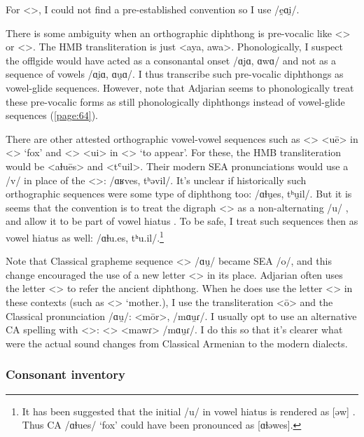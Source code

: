For <>, I could not find a pre-established convention so I use /e̯ɑi̯/. 
	
There is some ambiguity when an orthographic diphthong is pre-vocalic like <> or <>. The HMB transliteration is just <aya, awa>. Phonologically, I suspect the offlgide would have acted as a consonantal onset /ɑjɑ, ɑwɑ/ and not as a sequence of vowels /ɑi̯ɑ, ɑu̯ɑ/. I thus transcribe such pre-vocalic diphthongs as vowel-glide sequences. However, note that Adjarian seems to phonologically treat these pre-vocalic forms as still phonologically diphthongs instead of vowel-glide sequences (\ref{page:64}). 




There are other attested orthographic vowel-vowel sequences such as <> <uē> in <> `fox' and <> <ui> in <> `to appear'. For these, the HMB transliteration would be <aɫuēs> and <tʿuil>. Their modern SEA pronunciations would use a /v/ in place of the <>: /ɑʁves, tʰəvil/. It's unclear if historically such orthographic sequences were some type of diphthong too: /ɑɫu̯es, tʰu̯il/. But it is seems that the convention is to treat the digraph <> as a non-alternating /u/ \citep[15]{Thomson-1989-IntroClassicalArmenian}, and allow it to be part of vowel hiatus \citep[17]{Thomson-1989-IntroClassicalArmenian}. To be safe, I treat such sequences then as vowel hiatus as well: /ɑɫu.es, tʰu.il/.\footnote{It has been suggested that the initial /u/ in vowel hiatus is rendered as [əw] \citep[13]{Kim-2021-phoneticsPhonologyOldArmenianWV}. Thus CA /ɑɫues/ `fox' could have been pronounced as [ɑɫəwes].  }

Note that Classical grapheme sequence <> /ɑu̯/ became SEA /o/, and this change encouraged the use of a new letter <> in its place. Adjarian often uses the letter <> to refer the ancient diphthong. When he does use the letter <> in these contexts (such as <> `mother.{\gen}), I use the transliteration <ō> and the Classical pronunciation /ɑu̯/: <mōr>, /mɑu̯ɾ/. I usually opt to use an alternative CA spelling with <>: <> <mawɾ> /mɑu̯ɾ/. I do this so that it's clearer what were the actual sound changes from Classical Armenian to the modern dialects. 


\subsubsection{Consonant inventory}\label{sec:HossepIntro:phonotransc:CA:cons}



